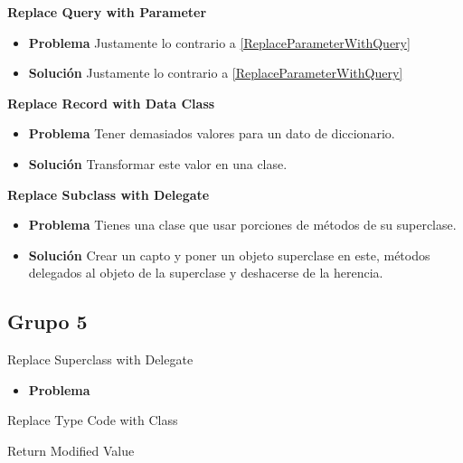 \documentclass[11pt,a4paper,oneside]{book}
\begin{document}
\textbf{Replace Query with Parameter}
\label{replaceQueryWithParameter}
\begin{itemize}
    \item \textbf{Problema} Justamente lo contrario a \ref{ReplaceParameterWithQuery}
    
    
    \item \textbf{Solución} Justamente lo contrario a \ref{ReplaceParameterWithQuery}
    
\end{itemize}

\textbf{Replace Record with Data Class}
\label{ReplaceRecordWithDataClass}
\begin{itemize}
    \item \textbf{Problema} Tener demasiados valores para un dato de diccionario.
    
    
    \item \textbf{Solución} Transformar este valor en una clase.
    
\end{itemize}

\textbf{Replace Subclass with Delegate}
\label{ReplaceSubclassWithDelegate}
\begin{itemize}
    \item \textbf{Problema} Tienes una clase que usar porciones de métodos de su superclase.
    
    
    \item \textbf{Solución} Crear un capto y poner un objeto superclase en este, métodos delegados al objeto de la superclase y deshacerse de la herencia.
    
\end{itemize}


\subsection{Grupo 5}
Replace Superclass with Delegate
\label{replaceSuperclassWithDelegate}
\begin{itemize}
    \item \textbf{Problema} 
\end{itemize}

Replace Type Code with Class

Return Modified Value
\end{document}
